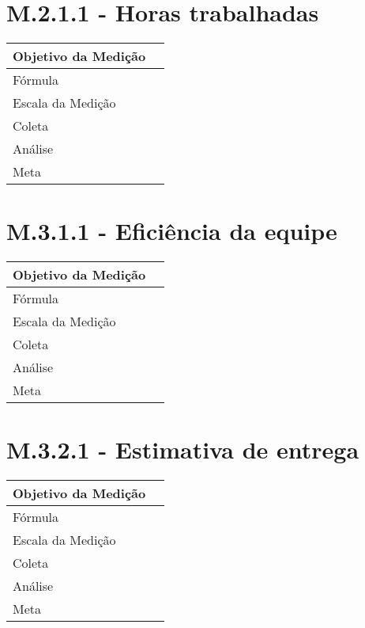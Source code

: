 \section{M.2.1.1 - Horas trabalhadas} %

	\begin{tabular}{ |p{5cm}|p{5cm}|  }
	 \hline
	 Objetivo da Medição 		& 	   \\
	 \hline
	 Fórmula		& 		\\
	 \hline
	 Escala da Medição 		& 		 \\
	 \hline
	 Coleta		& 		\\
	 \hline
	 Análise		& 		 \\
	 \hline
	 Meta		& 		 \\
	 \hline
	\end{tabular}

\section{M.3.1.1 - Eficiência da equipe} %

	\begin{tabular}{ |p{5cm}|p{5cm}|  }
	 \hline
	 Objetivo da Medição 		& 	   \\
	 \hline
	 Fórmula		& 		\\
	 \hline
	 Escala da Medição 		& 		 \\
	 \hline
	 Coleta		& 		\\
	 \hline
	 Análise		& 		 \\
	 \hline
	 Meta		& 		 \\
	 \hline
	\end{tabular}


\section{M.3.2.1 - Estimativa de entrega} %

	\begin{tabular}{ |p{5cm}|p{5cm}|  }
	 \hline
	 Objetivo da Medição 		& 	   \\
	 \hline
	 Fórmula		& 		\\
	 \hline
	 Escala da Medição 		& 		 \\
	 \hline
	 Coleta		& 		\\
	 \hline
	 Análise		& 		 \\
	 \hline
	 Meta		& 		 \\
	 \hline
	\end{tabular}